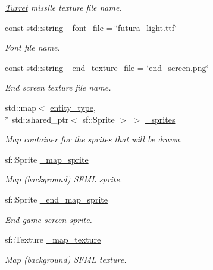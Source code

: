 \begin{DoxyCompactItemize}
\begin{DoxyCompactList}\small\item\em \hyperlink{classTurret}{Turret} missile texture file name. \end{DoxyCompactList}\item 
const std\-::string \hyperlink{classDisplay_a69effabf34c7f71ddf83be77977b56f2}{\-\_\-font\-\_\-file} = \char`\"{}futura\-\_\-light.\-ttf\char`\"{}
\begin{DoxyCompactList}\small\item\em Font file name. \end{DoxyCompactList}\item 
const std\-::string \hyperlink{classDisplay_ac8eb9dbc23ed61c56ea69adfdbfeecde}{\-\_\-end\-\_\-texture\-\_\-file} = \char`\"{}end\-\_\-screen.\-png\char`\"{}
\begin{DoxyCompactList}\small\item\em End screen texture file name. \end{DoxyCompactList}\item 
std\-::map$<$ \hyperlink{Structures_8h_a6d8f83e710b27d4f86c45f0bb77066e3}{entity\-\_\-type}, \\*
std\-::shared\-\_\-ptr$<$ sf\-::\-Sprite $>$ $>$ \hyperlink{classDisplay_a975326ca007706c154317ddef67000f4}{\-\_\-sprites}
\begin{DoxyCompactList}\small\item\em Map container for the sprites that will be drawn. \end{DoxyCompactList}\item 
sf\-::\-Sprite \hyperlink{classDisplay_a2ec82cf1355d968c3863c9089ab2e511}{\-\_\-map\-\_\-sprite}
\begin{DoxyCompactList}\small\item\em Map (background) S\-F\-M\-L sprite. \end{DoxyCompactList}\item 
sf\-::\-Sprite \hyperlink{classDisplay_a3bcec98cfc7e32f4fb46e625d76984a0}{\-\_\-end\-\_\-map\-\_\-sprite}
\begin{DoxyCompactList}\small\item\em End game screen sprite. \end{DoxyCompactList}\item 
sf\-::\-Texture \hyperlink{classDisplay_aa98ca168c20ac56fe56def6686cf9f91}{\-\_\-map\-\_\-texture}
\begin{DoxyCompactList}\small\item\em Map (background) S\-F\-M\-L texture. \end{DoxyCompactList}\item 

\end{DoxyCompactItemize}
